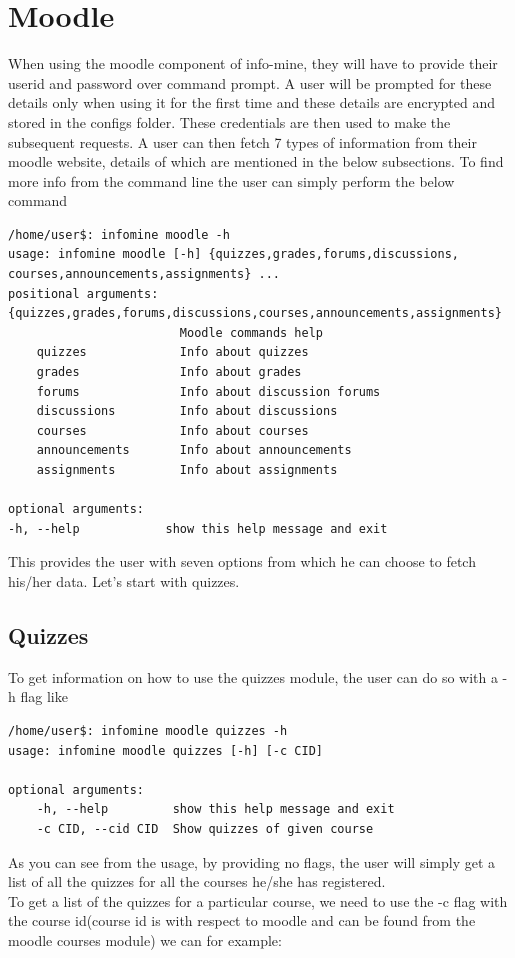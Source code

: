 \documentclass[12pt, a4paper]{article}
\begin{document}
\section{Moodle}
When using the moodle component of info-mine, they will have to provide their userid and password over command prompt.
A user will be prompted for these details only when using it for the first time and these details are encrypted and stored in the configs
folder. 
These credentials are then used to make the subsequent requests.
A user can then fetch 7 types of information from their moodle website, details of which are mentioned in the below subsections.
To find more info from the command line the user can simply perform the below command
\begin{verbatim}
/home/user$: infomine moodle -h
usage: infomine moodle [-h] {quizzes,grades,forums,discussions,
courses,announcements,assignments} ...
positional arguments:
{quizzes,grades,forums,discussions,courses,announcements,assignments}
                        Moodle commands help
    quizzes             Info about quizzes
    grades              Info about grades
    forums              Info about discussion forums
    discussions         Info about discussions
    courses             Info about courses
    announcements       Info about announcements
    assignments         Info about assignments

optional arguments:
-h, --help            show this help message and exit

\end{verbatim}
    This provides the user with seven options from which he can choose to fetch his/her data.
    Let's start with quizzes.
\subsection{Quizzes}
To get information on how to use the quizzes module, the user can do so with a -h flag like
\begin{verbatim}
/home/user$: infomine moodle quizzes -h
usage: infomine moodle quizzes [-h] [-c CID]

optional arguments:
    -h, --help         show this help message and exit
    -c CID, --cid CID  Show quizzes of given course
\end{verbatim}
As you can see from the usage, by providing no flags, the user will simply get a list of all the quizzes for all the courses he/she has registered.\\
To get a list of the quizzes for a particular course, we need to use the -c flag with the course id(course id is with respect to moodle and can be found from the moodle courses module) we can for example:
\end{document}
